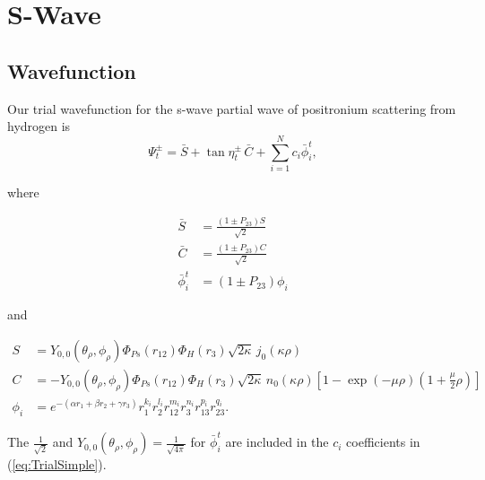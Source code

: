 \documentclass[Dissertation.tex]{subfiles}
\begin{document}
\chapter{S-Wave}
\label{chp:SWave}

\section{Wavefunction}
Our trial wavefunction for the s-wave partial wave of positronium scattering from hydrogen is
\begin{equation}
\Psi_t^\pm = \bar{S} + \tan \eta_t^\pm \, \bar{C} + \sum_{i=1}^N c_i \bar{\phi}_i^t ,
\label{eq:SWaveTrialSimple}
\end{equation}

\noindent where

\begin{subequations}\label{SCphiBarDef}
\begin{align}
\bar{S} &= \frac{\left( 1 \pm P_{23} \right) S}{\sqrt{2}} \label{SBarDef} \\
\bar{C} &= \frac{\left( 1 \pm P_{23} \right) C}{\sqrt{2}} \label{CBarDef} \\
\bar{\phi}_i^t &= \left( 1 \pm P_{23} \right) \phi_i \label{PhiBarDef}
\end{align}
\end{subequations}

\noindent and

\begin{subequations}\label{eq:SCPhiDef}
\begin{align}
S &= Y_{0,0}\!\left( \theta_\rho, \phi_\rho \right) \Phi_{Ps}\left(r_{12}\right) \Phi_H\left(r_3\right) \sqrt{2\kappa} \,j_0\!\left(\kappa\rho\right) \label{eq:SDef} \\
C &= -Y_{0,0}\!\left( \theta_\rho, \phi_\rho \right) \Phi_{Ps}\left(r_{12}\right) \Phi_H\left(r_3\right) \sqrt{2\kappa} \,n_0\!\left(\kappa\rho\right) \left[1 - \exp(-\mu \rho) (1+\frac{\mu}{2}\rho)\right] \label{eq:CDef} \\
\phi_i &= e^{-\left(\alpha r_1 + \beta r_2 + \gamma r_3 \right)} r_1^{k_i} r_2^{l_i} r_{12}^{m_i} r_3^{n_i} r_{13}^{p_i} r_{23}^{q_i}. \label{eq:PhiDef}
\end{align}
\end{subequations}

\noindent The $\frac{1}{\sqrt{2}}$ and $Y_{0,0}\left( \theta_\rho, \phi_\rho \right) = \frac{1}{\sqrt{4\pi}}$ for $\bar{\phi}_i^t$ are included in the $c_i$ coefficients in (\ref{eq:TrialSimple}).
\end{document}
